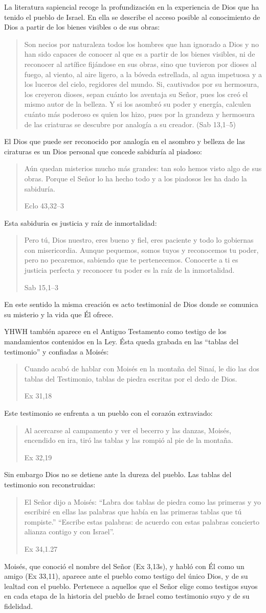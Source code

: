 La literatura sapiencial recoge la profundización en la experiencia de Dios que ha tenido el pueblo de Israel. En ella se describe el acceso posible al conocimiento de Dios a partir de los bienes visibles o de sus obras: \blockquote[]{Son necios por naturaleza todos los hombres que han ignorado a Dios y no han sido capaces de conocer al que es a partir de los bienes visibles, ni de reconocer al artífice fijándose en sus obras, sino que tuvieron por dioses al fuego, al viento, al aire ligero, a la bóveda estrellada, al agua impetuosa y a los luceros del cielo, regidores del mundo. Si, cautivados por su hermosura, los creyeron dioses, sepan cuánto los aventaja su Señor, pues los creó el mismo autor de la belleza. Y si los asombró su poder y energía, calculen cuánto más poderoso es quien los hizo, pues por la grandeza y hermosura de las criaturas se descubre por analogía a su creador. (Sab 13,1--5)}

El Dios que puede ser reconocido por analogía en el asombro y belleza de las ciraturas es un Dios personal que concede sabiduría al piadoso: \blockquote[Eclo 43,32--3]{Aún quedan misterios mucho más grandes: tan solo hemos visto algo de sus obras. Porque el Señor lo ha hecho todo y a los piadosos les ha dado la sabiduría.} Esta sabiduria es justicia y raíz de inmortalidad: \blockquote[Sab 15,1--3]{Pero tú, Dios nuestro, eres bueno y fiel, eres paciente y todo lo gobiernas con misericordia. Aunque pequemos, somos tuyos y reconocemos tu poder, pero no pecaremos, sabiendo que te pertenecemos. Conocerte a ti es justicia perfecta y reconocer tu poder es la raíz de la inmortalidad.} En este sentido la misma creación es acto testimonial de Dios donde se comunica su misterio y la vida que Él ofrece.

YHWH también aparece en el Antiguo Testamento como testigo de los mandamientos contenidos en la Ley.\autocite[Cf.][115]{prades2015testimonio} Ésta queda grabada en las \enquote{tablas del testimonio} y confiadas a Moisés: \blockquote[Ex 31,18]{Cuando acabó de hablar con Moisés en la montaña del Sinaí, le dio las dos tablas del Testimonio, tablas de piedra escritas por el dedo de Dios.} Este testimonio se enfrenta a un pueblo con el corazón extraviado: \blockquote[Ex 32,19]{Al acercarse al campamento y ver el becerro y las danzas, Moisés, encendido en ira, tiró las tablas y las rompió al pie de la montaña.} Sin embargo Dios no se detiene ante la dureza del pueblo. Las tablas del testimonio son reconstruidas: \blockquote[Ex 34,1.27]{El Señor dijo a Moisés: \enquote{Labra dos tablas de piedra como las primeras y yo escribiré en ellas las palabras que había en las primeras tablas que tú rompiste.} \textelp{} \enquote{Escribe estas palabras: de acuerdo con estas palabras concierto alianza contigo y con Israel}.} Moisés, que conoció el nombre del Señor (Ex 3,13s), y habló con Él como un amigo (Ex 33,11), aparece ante el pueblo como testigo del único Dios, y de su lealtad con el pueblo. Pertenece a aquellos que el Señor elige como testigos suyos en cada etapa de la historia del pueblo de Israel como testimonio suyo y de su fidelidad.

